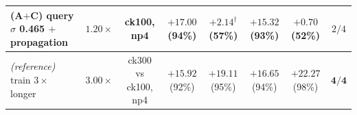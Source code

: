 \begin{table}[t]
{\begin{tabular}{lcc cc cc c}
(A$+$C) query $\sigma$ 0.465 $+$ propagation & $1.20\times$ & \scriptsize ck100, np4 & $+17.00$ \scriptsize(94\%) & $+2.14^{\dagger}$ \scriptsize(57\%) & $+15.32$ \scriptsize(93\%) & $+0.70$ \scriptsize(52\%) & $2/4$ \\
\midrule
\;\emph{(reference)} train $3\times$ longer & $3.00\times$ & \scriptsize ck300 vs ck100, np4 & $+15.92$ \scriptsize(92\%) & $+19.11$ \scriptsize(95\%) & $+16.65$ \scriptsize(94\%) & $+22.27$ \scriptsize(98\%) & $\mathbf{4/4}$ \\
\bottomrule
\end{tabular}}
\end{table}

